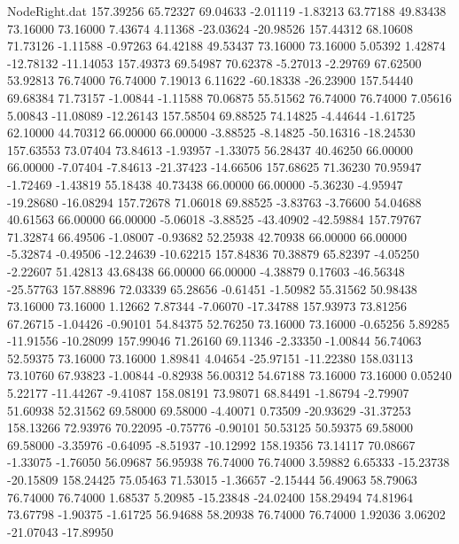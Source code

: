 \begin{filecontents}{NodeRight.dat}
 157.39256   65.72327   69.04633    -2.01119   -1.83213   63.77188   49.83438   73.16000   73.16000    7.43674    4.11368  -23.03624  -20.98526
 157.44312   68.10608   71.73126    -1.11588   -0.97263   64.42188   49.53437   73.16000   73.16000    5.05392    1.42874  -12.78132  -11.14053
 157.49373   69.54987   70.62378    -5.27013   -2.29769   67.62500   53.92813   76.74000   76.74000    7.19013    6.11622  -60.18338  -26.23900
 157.54440   69.68384   71.73157    -1.00844   -1.11588   70.06875   55.51562   76.74000   76.74000    7.05616    5.00843  -11.08089  -12.26143
 157.58504   69.88525   74.14825    -4.44644   -1.61725   62.10000   44.70312   66.00000   66.00000   -3.88525   -8.14825  -50.16316  -18.24530
 157.63553   73.07404   73.84613    -1.93957   -1.33075   56.28437   40.46250   66.00000   66.00000   -7.07404   -7.84613  -21.37423  -14.66506
 157.68625   71.36230   70.95947    -1.72469   -1.43819   55.18438   40.73438   66.00000   66.00000   -5.36230   -4.95947  -19.28680  -16.08294
 157.72678   71.06018   69.88525    -3.83763   -3.76600   54.04688   40.61563   66.00000   66.00000   -5.06018   -3.88525  -43.40902  -42.59884
 157.79767   71.32874   66.49506    -1.08007   -0.93682   52.25938   42.70938   66.00000   66.00000   -5.32874   -0.49506  -12.24639  -10.62215
 157.84836   70.38879   65.82397    -4.05250   -2.22607   51.42813   43.68438   66.00000   66.00000   -4.38879    0.17603  -46.56348  -25.57763
 157.88896   72.03339   65.28656    -0.61451   -1.50982   55.31562   50.98438   73.16000   73.16000    1.12662    7.87344   -7.06070  -17.34788
 157.93973   73.81256   67.26715    -1.04426   -0.90101   54.84375   52.76250   73.16000   73.16000   -0.65256    5.89285  -11.91556  -10.28099
 157.99046   71.26160   69.11346    -2.33350   -1.00844   56.74063   52.59375   73.16000   73.16000    1.89841    4.04654  -25.97151  -11.22380
 158.03113   73.10760   67.93823    -1.00844   -0.82938   56.00312   54.67188   73.16000   73.16000    0.05240    5.22177  -11.44267   -9.41087
 158.08191   73.98071   68.84491    -1.86794   -2.79907   51.60938   52.31562   69.58000   69.58000   -4.40071    0.73509  -20.93629  -31.37253
 158.13266   72.93976   70.22095    -0.75776   -0.90101   50.53125   50.59375   69.58000   69.58000   -3.35976   -0.64095   -8.51937  -10.12992
 158.19356   73.14117   70.08667    -1.33075   -1.76050   56.09687   56.95938   76.74000   76.74000    3.59882    6.65333  -15.23738  -20.15809
 158.24425   75.05463   71.53015    -1.36657   -2.15444   56.49063   58.79063   76.74000   76.74000    1.68537    5.20985  -15.23848  -24.02400
 158.29494   74.81964   73.67798    -1.90375   -1.61725   56.94688   58.20938   76.74000   76.74000    1.92036    3.06202  -21.07043  -17.89950

\end{filecontents}
